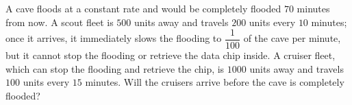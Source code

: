 A cave floods at a constant rate and would be completely flooded $70$ minutes from now. A scout fleet is $500$ units away and travels $200$ units every $10$ minutes; once it arrives, it immediately slows the flooding to $\dfrac{1}{100}$ of the cave per minute, but it cannot stop the flooding or retrieve the data chip inside. A cruiser fleet, which can stop the flooding and retrieve the chip, is $1000$ units away and travels $100$ units every $15$ minutes. Will the cruisers arrive before the cave is completely flooded?
